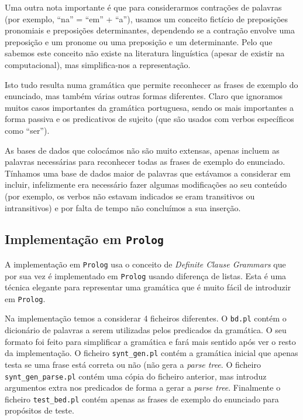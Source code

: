 \documentclass[12pt,a4paper,oneside]{article}
\begin{document}
Uma outra nota importante é que para considerarmos contrações de
palavras (por exemplo, ``na'' = ``em'' + ``a''), usamos um conceito
fictício de preposições pronomiais e preposições determinantes,
dependendo se a contração envolve uma preposição e um pronome ou uma
preposição e um determinante. Pelo que sabemos este conceito não
existe na literatura linguística (apesar de existir na computacional),
mas simplifica-nos a representação.

Isto tudo resulta numa gramática que permite reconhecer as frases de
exemplo do enunciado, mas também várias outras formas
diferentes. Claro que ignoramos muitos casos importantes da gramática
portuguesa, sendo os mais importantes a forma passiva e os
predicativos de sujeito (que são usados com verbos específicos como
``ser'').

As bases de dados que colocámos não são muito extensas, apenas incluem
as palavras necessárias para reconhecer todas as frases de exemplo do
enunciado. Tínhamos uma base de dados maior de palavras que estávamos
a considerar em incluir, infelizmente era necessário fazer algumas
modificações ao seu conteúdo (por exemplo, os verbos não estavam
indicados se eram transitivos ou intransitivos) \cite{label:2003} e
por falta de tempo não concluímos a sua inserção.

\subsection{Implementação em \texttt{Prolog}}

A implementação em \texttt{Prolog} usa o conceito de \textit{Definite
  Clause Grammars} \cite{DCG:2015} que por sua vez é implementado em
\texttt{Prolog} usando diferença de listas. Esta é uma técnica
elegante para representar uma gramática que é muito fácil de
introduzir em \texttt{Prolog}.

Na implementação temos a considerar 4 ficheiros diferentes. O
\texttt{bd.pl} contém o dicionário de palavras a serem utilizadas
pelos predicados da gramática. O seu formato foi feito para
simplificar a gramática e fará mais sentido após ver o resto da
implementação. O ficheiro \texttt{synt\_gen.pl} contém a gramática
inicial que apenas testa se uma frase está correta ou não (não gera a
\textit{parse tree}. O ficheiro \texttt{synt\_gen\_parse.pl} contém
uma cópia do ficheiro anterior, mas introduz argumentos extra nos
predicados de forma a gerar a \textit{parse tree}. Finalmente o
ficheiro \texttt{test\_bed.pl} contém apenas as frases de exemplo do
enunciado para propósitos de teste.
\end{document}
